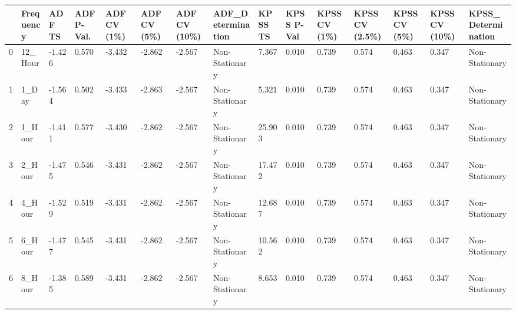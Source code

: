 \begin{tabular}{lllllllllllllll}
\toprule
 & Frequency & ADF TS & ADF P-Val. & ADF CV (1\%) & ADF CV (5\%) & ADF CV (10\%) & ADF_Determination & KPSS TS & KPSS P-Val & KPSS CV (1\%) & KPSS CV (2.5\%) & KPSS CV (5\%) & KPSS CV (10\%) & KPSS_Determination \\
\midrule
0 & 12_Hour & -1.426 & 0.570 & -3.432 & -2.862 & -2.567 & Non-Stationary & 7.367 & 0.010 & 0.739 & 0.574 & 0.463 & 0.347 & Non-Stationary \\
1 & 1_Day & -1.564 & 0.502 & -3.433 & -2.863 & -2.567 & Non-Stationary & 5.321 & 0.010 & 0.739 & 0.574 & 0.463 & 0.347 & Non-Stationary \\
2 & 1_Hour & -1.411 & 0.577 & -3.430 & -2.862 & -2.567 & Non-Stationary & 25.903 & 0.010 & 0.739 & 0.574 & 0.463 & 0.347 & Non-Stationary \\
3 & 2_Hour & -1.475 & 0.546 & -3.431 & -2.862 & -2.567 & Non-Stationary & 17.472 & 0.010 & 0.739 & 0.574 & 0.463 & 0.347 & Non-Stationary \\
4 & 4_Hour & -1.529 & 0.519 & -3.431 & -2.862 & -2.567 & Non-Stationary & 12.687 & 0.010 & 0.739 & 0.574 & 0.463 & 0.347 & Non-Stationary \\
5 & 6_Hour & -1.477 & 0.545 & -3.431 & -2.862 & -2.567 & Non-Stationary & 10.562 & 0.010 & 0.739 & 0.574 & 0.463 & 0.347 & Non-Stationary \\
6 & 8_Hour & -1.385 & 0.589 & -3.431 & -2.862 & -2.567 & Non-Stationary & 8.653 & 0.010 & 0.739 & 0.574 & 0.463 & 0.347 & Non-Stationary \\
\bottomrule
\end{tabular}
